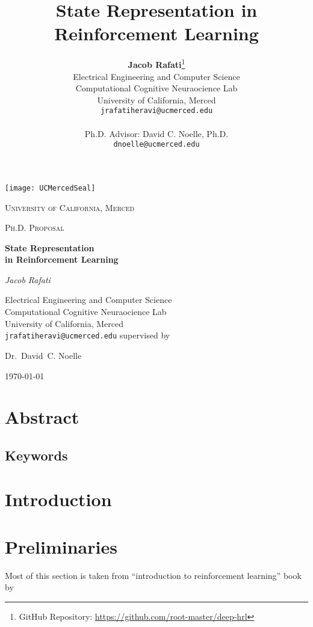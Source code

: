 \documentclass[letterpaper,titlepage]{article}
\title{\textbf{State Representation in Reinforcement Learning}}
\author{\textbf{Jacob Rafati}\thanks{GitHub Repository: \url{https://github.com/root-master/deep-hrl}}\\ Electrical Engineering and Computer Science \\ Computational Cognitive Neuraocience Lab \\ University of California, Merced \\ \texttt{jrafatiheravi@ucmerced.edu} \\ \\ Ph.D. Advisor: David C. Noelle, Ph.D. \\ \texttt{dnoelle@ucmerced.edu} \\}
\date{}
\begin{document}

\begin{titlepage}
	\centering
	\texttt{[image: UCMercedSeal]}\par\vspace{1cm}
	{\scshape\LARGE University of California, Merced \par}
	\vspace{1cm}
	{\scshape\Large Ph.D. Proposal\par}
	\vspace{1.5cm}
	{\huge\bfseries State Representation \\ in Reinforcement Learning \par}
	\vspace{2cm}
	{\Large\itshape Jacob Rafati\par}
	\vspace{1cm}
	Electrical Engineering and Computer Science \\ Computational Cognitive Neuraocience Lab \\ University of California, Merced \\ 
	\vspace{0.5cm}
	\texttt{jrafatiheravi@ucmerced.edu}
	\vfill
	supervised by\par
	Dr.~David~C. Noelle

	\vfill

	{\large \today\par}
\end{titlepage}


\tableofcontents
\newpage
\section*{Abstract} 
\label{sec:abstract}

\subsection*{Keywords} 
\newpage

\section{Introduction} 
\label{sec:introduction}
\newpage

\section{Preliminaries} 
\label{sec:background}
Most of this section is taken from ``introduction to reinforcement learning'' book by \cite{RL-Book:Sutton:1998} 
\end{document}
